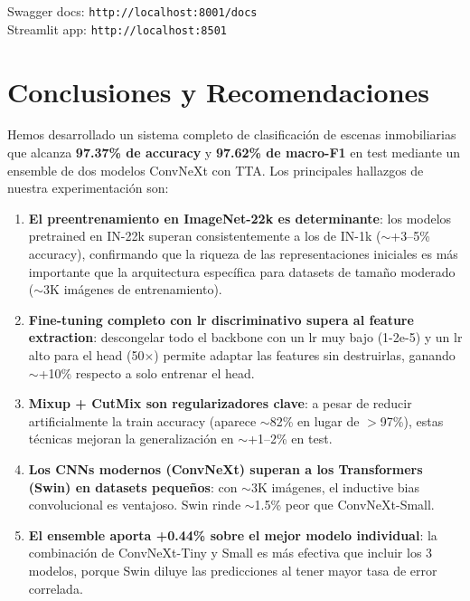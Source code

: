 \documentclass[10pt,a4paper,twocolumn]{article}
\begin{document}
Swagger docs: \texttt{http://localhost:8001/docs}\\
Streamlit app: \texttt{http://localhost:8501}

\section{Conclusiones y Recomendaciones}

Hemos desarrollado un sistema completo de clasificación de escenas inmobiliarias que alcanza \textbf{97.37\% de accuracy} y \textbf{97.62\% de macro-F1} en test mediante un ensemble de dos modelos ConvNeXt con TTA. Los principales hallazgos de nuestra experimentación son:

\begin{enumerate}
    \item \textbf{El preentrenamiento en ImageNet-22k es determinante}: los modelos pretrained en IN-22k superan consistentemente a los de IN-1k ($\sim$+3--5\% accuracy), confirmando que la riqueza de las representaciones iniciales es más importante que la arquitectura específica para datasets de tamaño moderado ($\sim$3K imágenes de entrenamiento).

    \item \textbf{Fine-tuning completo con lr discriminativo supera al feature extraction}: descongelar todo el backbone con un lr muy bajo (1-2e-5) y un lr alto para el head (50$\times$) permite adaptar las features sin destruirlas, ganando $\sim$+10\% respecto a solo entrenar el head.

    \item \textbf{Mixup + CutMix son regularizadores clave}: a pesar de reducir artificialmente la train accuracy (aparece $\sim$82\% en lugar de $>$97\%), estas técnicas mejoran la generalización en $\sim$+1--2\% en test.

    \item \textbf{Los CNNs modernos (ConvNeXt) superan a los Transformers (Swin) en datasets pequeños}: con $\sim$3K imágenes, el inductive bias convolucional es ventajoso. Swin rinde $\sim$1.5\% peor que ConvNeXt-Small.

    \item \textbf{El ensemble aporta +0.44\% sobre el mejor modelo individual}: la combinación de ConvNeXt-Tiny y Small es más efectiva que incluir los 3 modelos, porque Swin diluye las predicciones al tener mayor tasa de error correlada.
\end{enumerate}
\end{document}
